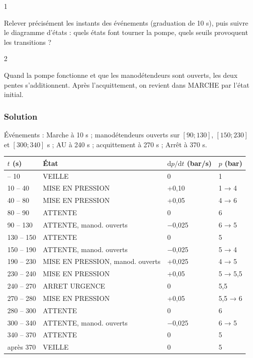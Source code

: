 \documentclass[11pt,a4paper]{article}
\begin{document}
\begin{indication}{1}

Relever précisément les instants des événements (graduation de 10 s), puis suivre le diagramme d'états : quels états font tourner la pompe, quels seuils provoquent les transitions ?

\end{indication}

\begin{indication}{2}

Quand la pompe fonctionne et que les manodétendeurs sont ouverts, les deux pentes s'additionnent. Après l'acquittement, on revient dans MARCHE par l'état initial.

\end{indication}

\hypertarget{solution-47}{%
\subsubsection{Solution}\label{solution-47}}

Événements : Marche à 10 s ; manodétendeurs ouverts sur \([90;130]\), \([150;230]\) et \([300;340]\) s ; AU à 240 s ; acquittement à 270 s ; Arrêt à 370 s.

\begin{longtable}[]{@{}llll@{}}
\toprule\noalign{}
\(t\) (s) & État & \(\mathrm dp/\mathrm dt\) (bar/s) & \(p\) (bar) \\
\midrule\noalign{}
\endhead
\bottomrule\noalign{}
\endlastfoot
0 -- 10 & VEILLE & 0 & 1 \\
10 -- 40 & MISE EN PRESSION & +0,10 & 1 → 4 \\
40 -- 80 & MISE EN PRESSION & +0,05 & 4 → 6 \\
80 -- 90 & ATTENTE & 0 & 6 \\
90 -- 130 & ATTENTE, manod. ouverts & −0,025 & 6 → 5 \\
130 -- 150 & ATTENTE & 0 & 5 \\
150 -- 190 & ATTENTE, manod. ouverts & −0,025 & 5 → 4 \\
190 -- 230 & MISE EN PRESSION, manod. ouverts & +0,025 & 4 → 5 \\
230 -- 240 & MISE EN PRESSION & +0,05 & 5 → 5,5 \\
240 -- 270 & ARRET URGENCE & 0 & 5,5 \\
270 -- 280 & MISE EN PRESSION & +0,05 & 5,5 → 6 \\
280 -- 300 & ATTENTE & 0 & 6 \\
300 -- 340 & ATTENTE, manod. ouverts & −0,025 & 6 → 5 \\
340 -- 370 & ATTENTE & 0 & 5 \\
après 370 & VEILLE & 0 & 5 \\
\end{longtable}
\end{document}
